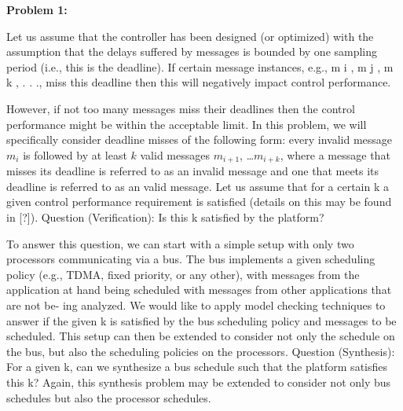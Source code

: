 

\textbf{Problem 1:}

Let us assume that the controller has been designed (or optimized) with the
assumption that the delays suffered by messages is bounded by one sampling
period (i.e., this is the deadline). If certain message instances, e.g., m i , m j ,
m k , . . ., miss this deadline then this will negatively impact control performance.

However, if not too many messages miss their deadlines then the control performance
might be within the acceptable limit.
In this problem, we will specifically consider deadline misses of the following
form:
every invalid message $m_i$ is followed by at least $k$ valid messages
$m_{i+1}$, \dots $m_{i+k}$,
where a message that misses its deadline is referred to as an invalid message
and one that meets its deadline is referred to as an valid message.
Let us assume that for a certain k a given control performance requirement
is satisfied (details on this may be found in [?]).
Question (Verification): Is this k satisfied by the platform?

To answer this question, we can start with a simple setup with only two processors
communicating via a bus. The bus implements a given scheduling policy
(e.g., TDMA, fixed priority, or any other), with messages from the application
at hand being scheduled with messages from other applications that are not be-
ing analyzed. We would like to apply model checking techniques to answer if the
given k is satisfied by the bus scheduling policy and messages to be scheduled.
This setup can then be extended to consider not only the schedule on the
bus, but also the scheduling policies on the processors.
Question (Synthesis): For a given k, can we synthesize a bus schedule such
that the platform satisfies this k?
Again, this synthesis problem may be extended to consider not only bus
schedules but also the processor schedules.

